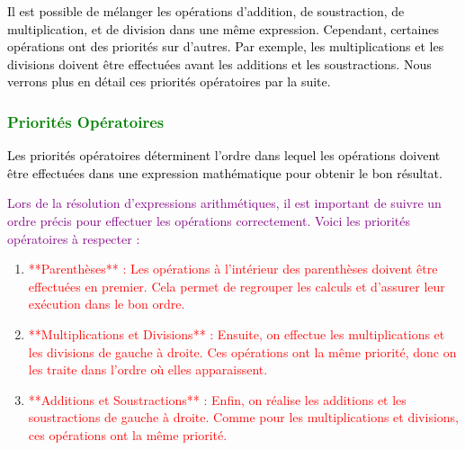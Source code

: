 \documentclass{article}
\begin{document}
\begin{tcolorbox}[colback=cyan!10!white, colframe=lime!75!black, title=\textcolor{black}{Remarque}, 
                  sharp corners=southwest]
\textcolor{black}{
Il est possible de mélanger les opérations d'addition, de soustraction, de multiplication, et de division dans une même expression. Cependant, certaines opérations ont des priorités sur d'autres. Par exemple, les multiplications et les divisions doivent être effectuées avant les additions et les soustractions. Nous verrons plus en détail ces priorités opératoires par la suite.
}
\end{tcolorbox}

\subsubsection{\textcolor{green}{Priorités Opératoires}}

\vspace{0.25cm}

\begin{tcolorbox}[colback=cyan!10!white, colframe=red!75!black, title=\textcolor{white}{Définition}, 
                  sharp corners=southwest]

\textcolor{black}{Les priorités opératoires déterminent l'ordre dans lequel les opérations doivent être effectuées dans une expression mathématique pour obtenir le bon résultat.}
\end{tcolorbox}

\vspace{0.35cm}

\textcolor{purple}{Lors de la résolution d'expressions arithmétiques, il est important de suivre un ordre précis pour effectuer les opérations correctement. Voici les priorités opératoires à respecter :}

\vspace{0.35cm}

\begin{enumerate}
    \item \textcolor{red}{**Parenthèses** : Les opérations à l'intérieur des parenthèses doivent être effectuées en premier. Cela permet de regrouper les calculs et d'assurer leur exécution dans le bon ordre.}
    \item \textcolor{red}{**Multiplications et Divisions** : Ensuite, on effectue les multiplications et les divisions de gauche à droite. Ces opérations ont la même priorité, donc on les traite dans l'ordre où elles apparaissent.}
    \item \textcolor{red}{**Additions et Soustractions** : Enfin, on réalise les additions et les soustractions de gauche à droite. Comme pour les multiplications et divisions, ces opérations ont la même priorité.}
\end{enumerate}
\end{document}
